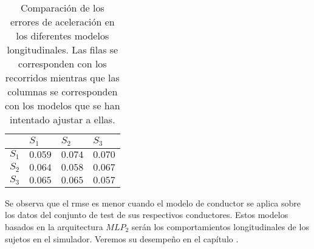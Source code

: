 \begin{table}
	\centering
	\caption[Comparación de los errores de aceleración en los diferentes modelos longitudinales]{Comparación de los errores de aceleración en los diferentes modelos longitudinales. Las filas se corresponden con los recorridos mientras que las columnas se corresponden con los modelos que se han intentado ajustar a ellas.}
	\label{tbl:lm-subjects-comparison}
	\begin{tabularx}{\linewidth}{YYYY}
		\toprule
		& $S_1$ & $S_2$ & $S_3$ \\
		\midrule
		 $S_1$ & $0.059$        & $0.074$        & $0.070$ \\
		$S_2$ & $0.064$        & $0.058$        & $0.067$ \\
		 $S_3$ & $0.065$        & $0.065$        & $0.057$ \\
		\bottomrule
	\end{tabularx}
\end{table}

Se observa que el \acrshort{rmse} es menor cuando el modelo de conductor se aplica sobre los datos del conjunto de test de sus respectivos conductores. Estos modelos basados en la arquitectura $MLP_2$ serán los comportamientos longitudinales de los sujetos en el simulador. Veremos su desempeño en el capítulo .